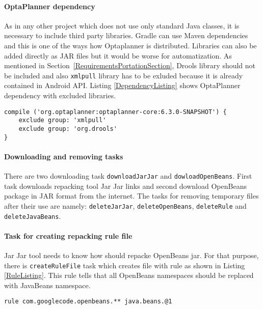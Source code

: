 \paragraph{OptaPlanner dependency}
As in any other project which does not use only standard Java classes, it is necessary to include third party
libraries. Gradle can use Maven dependencies and this is one of the ways how Optaplanner is distributed. Libraries can
also be added directly as JAR files but it would be worse for automatization. As mentioned in
Section~\ref{RequirementsPortationSection}, Drools library should not be included and also \texttt{xmlpull} library has
to be exluded because it is already contained in Android API. Listing \ref{DependencyListing} shows OptaPlanner
dependency with excluded libraries.
\\
\begin{lstlisting}[captionpos={b},caption={Optaplanner Maven dependency in Gradle build script.},frame={lines},
label={DependencyListing},basicstyle=\footnotesize]
compile ('org.optaplanner:optaplanner-core:6.3.0-SNAPSHOT') {
    exclude group: 'xmlpull'
    exclude group: 'org.drools'
}
\end{lstlisting}

\paragraph{Downloading and removing tasks}
There are two downloading task \texttt{downloadJarJar} and \texttt{dowloadOpenBeans}. First task downloads repacking
tool Jar Jar links and second download OpenBeans package in JAR format from the internet. The tasks for removing
temporary files after their use are namely: \texttt{deleteJarJar}, \texttt{deleteOpenBeans}, \texttt{deleteRule} and
\texttt{deleteJavaBeans}.

\paragraph{Task for creating repacking rule file}
Jar Jar tool needs to know how should repacke OpenBeans jar. For that purpose, there is \texttt{createRuleFile} task
which creates file with rule as shown in Listing \ref{RuleListing}. This rule tells that all OpenBeans namespaces should
be replaced with JavaBeans namespace.
\\
\begin{lstlisting}[captionpos={b},caption={Jar Jar Links rule for repacking OpenBeans to Java core namespace.},
frame={lines},label={RuleListing},basicstyle=\footnotesize]
rule com.googlecode.openbeans.** java.beans.@1
\end{lstlisting}

